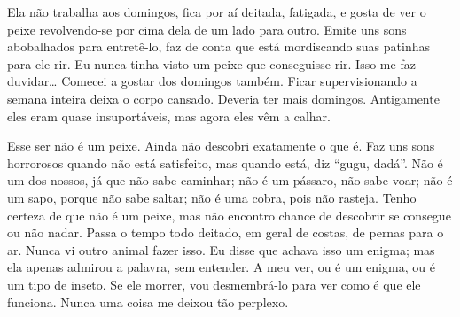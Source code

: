   Ela não trabalha aos domingos, fica por aí deitada, fatigada, e
gosta de ver o peixe revolvendo-se por cima dela de um lado para outro. Emite 
uns sons abobalhados para entretê-lo, faz de conta que está
mordiscando suas patinhas para ele rir. Eu nunca tinha visto um peixe que
conseguisse rir. Isso me faz duvidar\ldots{} Comecei a gostar dos domingos também.
Ficar supervisionando a semana inteira deixa o corpo cansado. Deveria ter mais
domingos. Antigamente eles eram quase insuportáveis, mas agora eles vêm a calhar.

   Esse ser não é um peixe. Ainda não descobri exatamente o que é.
Faz uns sons horrorosos quando não está satisfeito, mas quando está, diz
“gugu, dadá”. Não é um dos nossos, já que não sabe caminhar; não é
um pássaro, não sabe voar; não é um sapo, porque não sabe saltar; não é
uma cobra, pois não rasteja. Tenho certeza de que não é um peixe, mas não
encontro chance de descobrir se consegue ou não nadar. Passa o tempo todo
deitado, em geral de costas, de pernas para o ar. Nunca vi
outro animal fazer isso. Eu disse que achava isso um enigma; mas ela
apenas admirou a palavra, sem entender. A meu ver, ou é um enigma, ou é um
tipo de inseto. Se ele morrer, vou desmembrá-lo para ver como é que ele
funciona. Nunca uma coisa me deixou tão perplexo.

